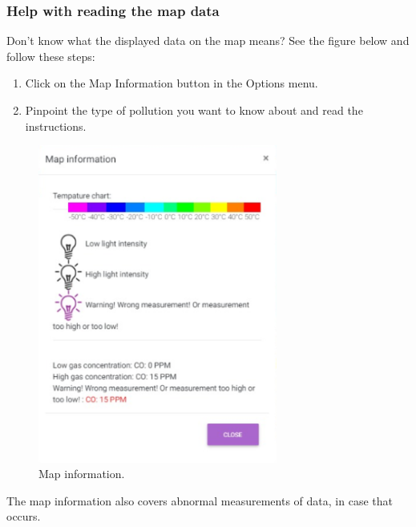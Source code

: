 \documentclass[a4paper]{article}
\begin{document}
\subsubsection*{Help with reading the map data}
Don't know what the displayed data on the map means? See the figure below and follow these steps:
\begin{enumerate}
\item Click on the Map Information button in the Options menu.
\item Pinpoint the type of pollution you want to know about and read the instructions.
\end{enumerate}
\begin{figure}[h!]
  \caption{Map information.}
  \centering
  \includegraphics[width=0.7\textwidth]{legend}
\end{figure}
The map information also covers abnormal measurements of data, in case that occurs.

\newpage
\end{document}
